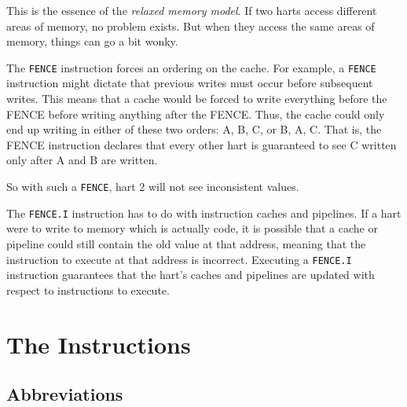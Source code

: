 \documentclass[11pt,twoside,letterpaper,titlepage]{report}
\begin{document}
\par
This is the essence of the \textit{relaxed memory model}. If two harts access different areas
of memory, no problem exists. But when they access the same areas of memory, things can go
a bit wonky.

\par
The \texttt{FENCE} instruction forces an ordering on the cache. For example, a \texttt{FENCE}
instruction might dictate that previous writes must occur before subsequent writes. This means
that a cache would be forced to write everything before the FENCE before writing anything after
the FENCE. Thus, the cache could only end up writing in either of these two orders: A, B, C, or
B, A, C. That is, the FENCE instruction declares that every other hart is guaranteed to see C
written only after A and B are written.

\par
So with such a \texttt{FENCE}, hart 2 will not see inconsistent values.

\par
The \texttt{FENCE.I} instruction has to do with instruction caches and pipelines. If a
hart were to write to memory which is actually code, it is possible that a cache or pipeline could
still contain the old value at that address, meaning that the instruction to execute at that
address is incorrect. Executing a \texttt{FENCE.I} instruction guarantees that the hart's
caches and pipelines are updated with respect to instructions to execute.

\chapter{The Instructions}

\section{Abbreviations}
\end{document}
